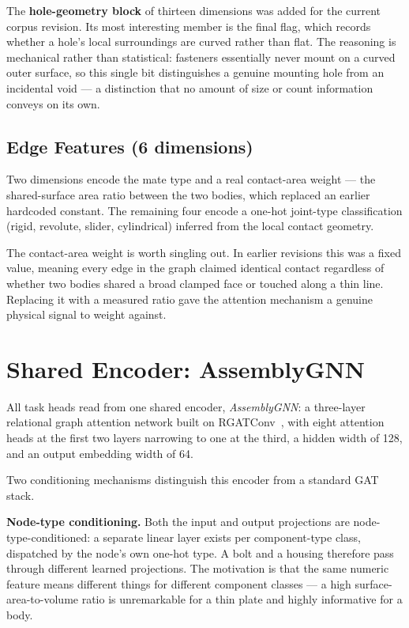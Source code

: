 \documentclass[12pt,oneside,a4paper]{report}
\begin{document}
The \textbf{hole-geometry block} of thirteen dimensions was added for the
current corpus revision. Its most interesting member is the final flag,
which records whether a hole's local surroundings are curved rather than
flat. The reasoning is mechanical rather than statistical: fasteners
essentially never mount on a curved outer surface, so this single bit
distinguishes a genuine mounting hole from an incidental void --- a
distinction that no amount of size or count information conveys on its own.

\subsection{Edge Features (6 dimensions)}

Two dimensions encode the mate type and a real contact-area weight --- the
shared-surface area ratio between the two bodies, which replaced an earlier
hardcoded constant. The remaining four encode a one-hot joint-type
classification (rigid, revolute, slider, cylindrical) inferred from the local
contact geometry.

The contact-area weight is worth singling out. In earlier revisions this was
a fixed value, meaning every edge in the graph claimed identical contact
regardless of whether two bodies shared a broad clamped face or touched along
a thin line. Replacing it with a measured ratio gave the attention mechanism
a genuine physical signal to weight against.

\section{Shared Encoder: AssemblyGNN}
\label{sec:encoder}

All task heads read from one shared encoder, \textit{AssemblyGNN}: a
three-layer relational graph attention network built on
RGATConv~\cite{busbridge2019rgat}, with eight attention heads at the first
two layers narrowing to one at the third, a hidden width of 128, and an
output embedding width of 64.

Two conditioning mechanisms distinguish this encoder from a standard GAT
stack.

\textbf{Node-type conditioning.} Both the input and output projections are
node-type-conditioned: a separate linear layer exists per component-type
class, dispatched by the node's own one-hot type. A bolt and a housing
therefore pass through different learned projections. The motivation is that
the same numeric feature means different things for different component
classes --- a high surface-area-to-volume ratio is unremarkable for a thin
plate and highly informative for a body.
\end{document}
